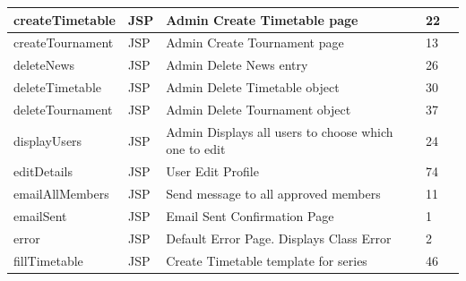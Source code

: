 \begin{table}[H]
\begin{center}
\begin{tabular}{| l | l | l| l |p{1cm} |}
	createTimetable & JSP & Admin Create Timetable page & 22\\ \hline	
	createTournament & JSP & Admin Create Tournament page & 13\\ \hline	
	deleteNews & JSP & Admin Delete News entry & 26\\ \hline	
	deleteTimetable & JSP & Admin Delete Timetable object & 30\\ \hline	
	deleteTournament & JSP & Admin Delete Tournament object & 37\\ \hline	
	displayUsers & JSP & Admin Displays all users to choose which one to edit & 24\\ \hline	
	editDetails & JSP & User Edit Profile & 74\\ \hline	
	emailAllMembers & JSP & Send message to all approved members & 11\\ \hline	
	emailSent & JSP & Email Sent Confirmation Page & 1\\ \hline	
	error & JSP & Default Error Page. Displays Class Error & 2\\ \hline	
	fillTimetable & JSP & Create Timetable template for series & 46\\ \hline	
    \end{tabular}
\end{center}
\end{table}
\pagebreak

